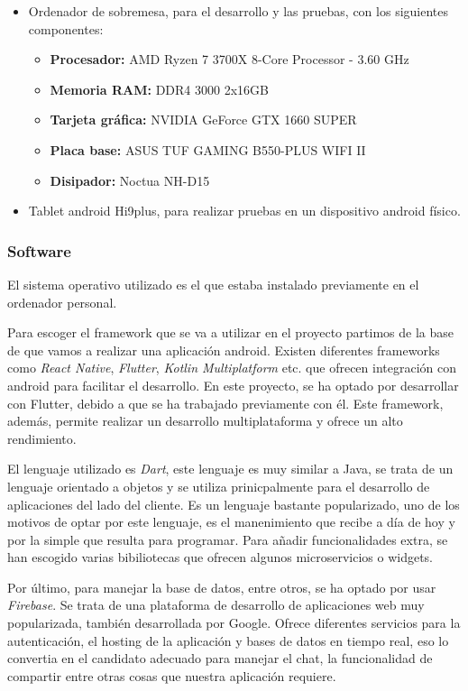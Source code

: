 \documentclass[a4paper, 12pt]{article}
\begin{document}
\begin{itemize}[noitemsep]
	\item Ordenador de sobremesa, para el desarrollo y las pruebas, con los siguientes componentes:
		\begin{itemize}[noitemsep]
			\item \textbf{Procesador:} AMD Ryzen 7 3700X 8-Core Processor - 3.60 GHz
			\item \textbf{Memoria RAM:} DDR4 3000 2x16GB
			\item \textbf{Tarjeta gráfica:} NVIDIA GeForce GTX 1660 SUPER
			\item \textbf{Placa base:} ASUS TUF GAMING B550-PLUS WIFI II
			\item \textbf{Disipador:} Noctua NH-D15
		\end{itemize}
	\item Tablet android Hi9plus, para realizar pruebas en un dispositivo android físico.
\end{itemize}

\subsubsection{Software}

El sistema operativo utilizado es el que estaba instalado previamente en el ordenador personal.

Para escoger el framework que se va a utilizar en el proyecto partimos de la base de que vamos a realizar una aplicación android. Existen diferentes frameworks como \textit{React Native}, \textit{Flutter}, \textit{Kotlin Multiplatform} etc. que ofrecen integración con android para facilitar el desarrollo. En este proyecto, se ha optado por desarrollar con Flutter, debido a que se ha trabajado previamente con él. Este framework, además, permite realizar un desarrollo multiplataforma y ofrece un alto rendimiento. 

El lenguaje utilizado es \textit{Dart}, este lenguaje es muy similar a Java, se trata de un lenguaje orientado a objetos y se utiliza prinicpalmente para el desarrollo de aplicaciones del lado del cliente. Es un lenguaje bastante popularizado, uno de los motivos de optar por este lenguaje, es el manenimiento que recibe a día de hoy y por la simple que resulta para programar. Para añadir funcionalidades extra, se han escogido varias bibiliotecas que ofrecen algunos microservicios o widgets.

Por último, para manejar la base de datos, entre otros, se ha optado por usar \textit{Firebase}. Se trata de una plataforma de desarrollo de aplicaciones web muy popularizada, también desarrollada por Google. Ofrece diferentes servicios para la autenticación, el hosting de la aplicación y bases de datos en tiempo real, eso lo convertia en el candidato adecuado para manejar el chat, la funcionalidad de compartir entre otras cosas que nuestra aplicación requiere.
\end{document}
